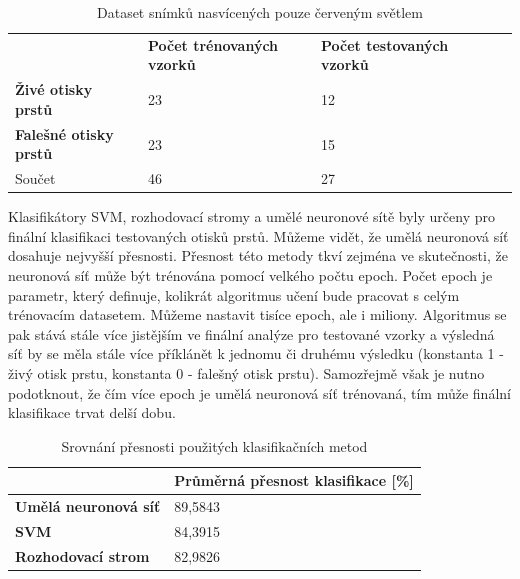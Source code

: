 \capstartfalse
\begin{table}[!htbp]
\begin{tabular}{|l|l|l|ll}
\cline{1-3}
\textbf{}                     & \textbf{Počet trénovaných vzorků} & \textbf{Počet testovaných vzorků} &  &  \\ \cline{1-3}
\textbf{Živé otisky prstů}    & 23                                & 12                                &  &  \\ \cline{1-3}
\textbf{Falešné otisky prstů} & 23                                & 15                                &  &  \\ \cline{1-3}
Součet                        & 46                                & 27                                &  &  \\ \cline{1-3}
\end{tabular}
\caption{Dataset snímků nasvícených pouze červeným světlem}
\end{table}
\capstarttrue

Klasifikátory SVM, rozhodovací stromy a umělé neuronové sítě byly určeny pro finální klasifikaci testovaných otisků prstů. Můžeme vidět, že umělá neuronová síť dosahuje nejvyšší přesnosti. Přesnost této metody tkví zejména ve skutečnosti, že neuronová síť může být trénována pomocí velkého počtu epoch. Počet epoch je parametr, který definuje, kolikrát algoritmus učení bude pracovat s celým trénovacím datasetem.\cite{BatchEpochANN} Můžeme nastavit tisíce epoch, ale i miliony. Algoritmus se pak stává stále více jistějším ve finální analýze pro testované vzorky a výsledná síť by se měla stále více příklánět k jednomu či druhému výsledku (konstanta 1 - živý otisk prstu, konstanta 0 - falešný otisk prstu). Samozřejmě však je nutno podotknout, že čím více epoch je umělá neuronová síť trénovaná, tím může finální klasifikace trvat delší dobu. 

\capstartfalse
\begin{table}[!htbp]
\begin{tabular}{|l|l|}
\hline
                             & \textbf{Průměrná přesnost klasifikace {[}\%{]}} \\ \hline
\textbf{Umělá neuronová síť} & 89,5843                                         \\ \hline
\textbf{SVM}                 & 84,3915                                         \\ \hline
\textbf{Rozhodovací strom}   & 82,9826                                         \\ \hline
\end{tabular}
\caption{Srovnání přesnosti použitých klasifikačních metod}
\end{table}
\capstarttrue


